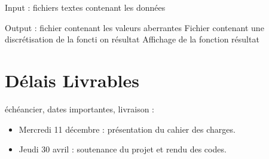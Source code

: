 \documentclass[a4paper,12pt]{article}
\begin{document}
Input : fichiers textes contenant les données

Output : fichier contenant les valeurs aberrantes
	   Fichier contenant une discrétisation de la foncti on résultat
	   Affichage de la fonction résultat

\newpage
\section{Délais Livrables}

échéancier, dates importantes, livraison :
\begin{itemize}
\item Mercredi 11 décembre : présentation du cahier des charges.
\item Jeudi 30 avril : soutenance du projet et rendu des codes.
\end{itemize}
\end{document}

